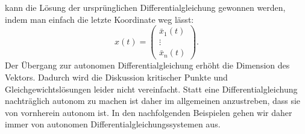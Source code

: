 kann die Lösung der ursprünglichen Differentialgleichung gewonnen
werden, indem man einfach die letzte Koordinate weg lässt:
\[
x(t)
=
\begin{pmatrix}
\bar x_1(t) \\ \vdots \\ \bar x_n(t)
\end{pmatrix}.
\]
Der Übergang zur autonomen Differentialgleichung erhöht die Dimension
des Vektors.
Dadurch wird die Diskussion kritischer Punkte und Gleichgewichtslösungen
leider nicht vereinfacht.
Statt eine Differentialgleichung nachträglich autonom zu machen
ist daher im allgemeinen anzustreben, dass sie von vornherein
autonom ist.
In den nachfolgenden Beispielen gehen wir daher immer von autonomen
Differentialgleichungssystemen aus.



